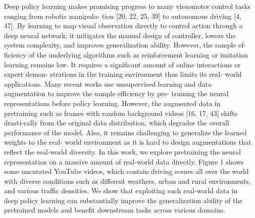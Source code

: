Deep policy learning makes promising progress to many visuomotor control tasks
ranging from robotic manipula- tion [20, 22, 25, 39] to autonomous driving [4,
47]. By learning to map visual observation directly to control action through a
deep neural network, it mitigates the manual design of controller, lowers the
system complexity, and improves generalization ability. However, the sample ef-
ficiency of the underlying algorithms such as reinforcement learning or
imitation learning remains low. It requires a significant amount of online
interactions or expert demon- strations in the training environment thus limits
its real- world applications.  Many recent works use unsupervised learning and
data augmentation to improve the sample efficiency by pre- training the neural
representations before policy learning.  However, the augmented data in
pretraining such as frames with random background videos [16, 17, 43] shifts
drasti-cally from the original data distribution, which degrades the overall
performance of the model. Also, it remains challenging to generalize the learned
weights to the real- world environment as it is hard to design augmentations
that reflect the real-world diversity. In this work, we explore pretraining the
neural representation on a massive amount of real-world data directly. Figure 1
shows some uncurated YouTube videos, which contain driving scenes all over the
world with diverse conditions such as different weathers, urban and rural
environments, and various traffic densities.  We show that exploiting such
real-world data in deep policy learning can substantially improve the
generalization ability of the pretrained models and benefit downstream tasks
across various domains.

